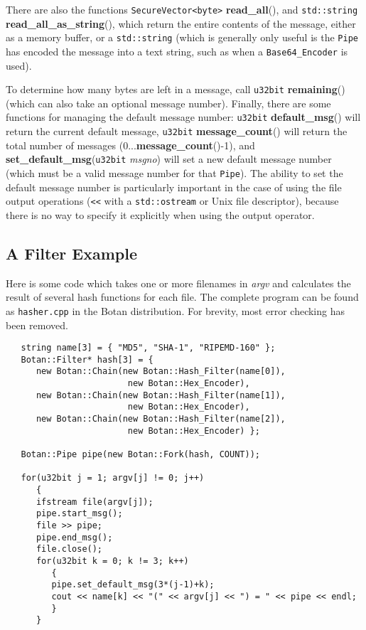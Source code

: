 \documentclass{article}
\newcommand{\filename}[1]{\texttt{#1}}
\newcommand{\function}[1]{\textbf{#1}}
\newcommand{\type}[1]{\texttt{#1}}
\renewcommand{\arg}[1]{\textsl{#1}}
\begin{document}
There are also the functions \type{SecureVector<byte>} \function{read\_all}(),
and \type{std::string} \function{read\_all\_as\_string}(), which return the
entire contents of the message, either as a memory buffer, or a
\type{std::string} (which is generally only useful is the \type{Pipe} has
encoded the message into a text string, such as when a \type{Base64\_Encoder}
is used).

To determine how many bytes are left in a message, call \type{u32bit}
\function{remaining}() (which can also take an optional message
number). Finally, there are some functions for managing the default message
number: \type{u32bit} \function{default\_msg}() will return the current default
message, \type{u32bit} \function{message\_count}() will return the total number
of messages (0...\function{message\_count}()-1), and
\function{set\_default\_msg}(\type{u32bit} \arg{msgno}) will set a new default
message number (which must be a valid message number for that \type{Pipe}). The
ability to set the default message number is particularly important in the case
of using the file output operations (\verb|<<| with a \type{std::ostream} or
Unix file descriptor), because there is no way to specify it explicitly when
using the output operator.

\subsection{A Filter Example}

Here is some code which takes one or more filenames in \arg{argv} and
calculates the result of several hash functions for each file. The complete
program can be found as \filename{hasher.cpp} in the Botan distribution. For
brevity, most error checking has been removed.

\begin{verbatim}
   string name[3] = { "MD5", "SHA-1", "RIPEMD-160" };
   Botan::Filter* hash[3] = {
      new Botan::Chain(new Botan::Hash_Filter(name[0]),
                        new Botan::Hex_Encoder),
      new Botan::Chain(new Botan::Hash_Filter(name[1]),
                        new Botan::Hex_Encoder),
      new Botan::Chain(new Botan::Hash_Filter(name[2]),
                        new Botan::Hex_Encoder) };

   Botan::Pipe pipe(new Botan::Fork(hash, COUNT));

   for(u32bit j = 1; argv[j] != 0; j++)
      {
      ifstream file(argv[j]);
      pipe.start_msg();
      file >> pipe;
      pipe.end_msg();
      file.close();
      for(u32bit k = 0; k != 3; k++)
         {
         pipe.set_default_msg(3*(j-1)+k);
         cout << name[k] << "(" << argv[j] << ") = " << pipe << endl;
         }
      }
\end{verbatim}
\end{document}
